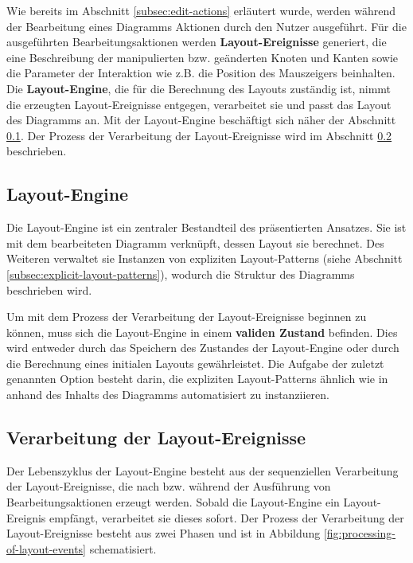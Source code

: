 Wie bereits im Abschnitt \ref{subsec:edit-actions} erläutert wurde, werden während der Bearbeitung eines Diagramms Aktionen durch den Nutzer ausgeführt. Für die ausgeführten Bearbeitungsaktionen werden \textbf{Layout-Ereignisse} generiert, die eine Beschreibung der manipulierten bzw. geänderten Knoten und Kanten sowie die Parameter der Interaktion wie z.B. die Position des Mauszeigers beinhalten. Die \textbf{Layout-Engine}, die für die Berechnung des Layouts zuständig ist, nimmt die erzeugten Layout-Ereignisse entgegen, verarbeitet sie und passt das Layout des Diagramms an. Mit der Layout-Engine beschäftigt sich näher der Abschnitt \ref{subsec:layout-engine}. Der Prozess der Verarbeitung der Layout-Ereignisse wird im Abschnitt \ref{subsec:processing-of-layout-events} beschrieben. 

\subsection{Layout-Engine}
\label{subsec:layout-engine}

Die Layout-Engine ist ein zentraler Bestandteil des präsentierten Ansatzes. Sie ist mit dem bearbeiteten Diagramm verknüpft, dessen Layout sie berechnet. Des Weiteren verwaltet sie Instanzen von expliziten Layout-Patterns (siehe Abschnitt \ref{subsec:explicit-layout-patterns}), wodurch die Struktur des Diagramms beschrieben wird.

Um mit dem Prozess der Verarbeitung der Layout-Ereignisse beginnen zu können, muss sich die Layout-Engine in einem \textbf{validen Zustand} befinden. Dies wird entweder durch das Speichern des Zustandes der Layout-Engine oder durch die Berechnung eines initialen Layouts gewährleistet. Die Aufgabe der zuletzt genannten Option besteht darin, die expliziten Layout-Patterns ähnlich wie in \cite{MaierMinas13A-Pattern-based} anhand des Inhalts des Diagramms automatisiert zu instanziieren.

\subsection{Verarbeitung der Layout-Ereignisse}
\label{subsec:processing-of-layout-events}

Der Lebenszyklus der Layout-Engine besteht aus der sequenziellen Verarbeitung der Layout-Ereignisse, die nach bzw. während der Ausführung von Bearbeitungsaktionen erzeugt werden. Sobald die Layout-Engine ein Layout-Ereignis empfängt, verarbeitet sie dieses sofort. Der Prozess der Verarbeitung der Layout-Ereignisse besteht aus zwei Phasen und ist in Abbildung \ref{fig:processing-of-layout-events} schematisiert.

